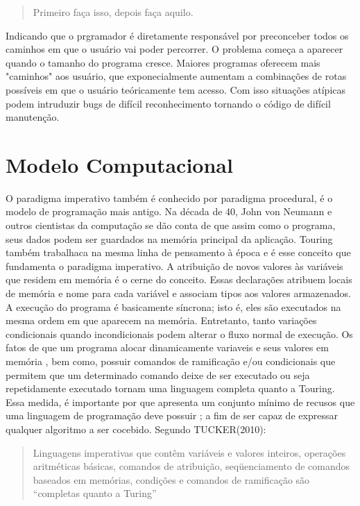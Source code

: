 \documentclass[11pt]{article}
\begin{document}
\begin{quote}
Primeiro faça isso, depois faça aquilo.
\end{quote}

Indicando que o prgramador é diretamente responsável por preconceber todos os caminhos em que o usuário vai poder percorrer. O problema começa a aparecer quando o tamanho do programa cresce. Maiores programas oferecem mais "caminhos" aos usuário, que exponecialmente aumentam a combinações de rotas possíveis em que o usuário teóricamente tem acesso. Com isso situações atípicas podem intruduzir bugs de difícil reconhecimento tornando o código de difícil manutenção.

\section{Modelo Computacional}
\label{sec:org42806ee}

O paradigma imperativo também é conhecido por paradigma procedural, é o modelo de programação mais antigo. Na década de 40, John von Neumann e outros cientistas da computação se dão conta de que assim como o programa, seus dados podem ser guardados na memória principal da aplicação. Touring também trabalhaca na mesma linha de pensamento à época e é esse conceito que fundamenta o paradigma imperativo. A atribuição de novos valores às variáveis que residem em memória é o cerne do conceito.
Essas declarações atribuem locais de memória e nome para cada variável e associam tipos aos valores armazenados. A execução do programa é basicamente síncrona; isto é, eles são executados na mesma ordem em que aparecem na memória. Entretanto, tanto variações condicionais quando incondicionais podem alterar o fluxo normal de execução. Os fatos de que um programa alocar dinamicamente variaveis e seus valores em memória , bem como, possuir comandos de ramificação e/ou condicionais que permitem que um determinado comando deixe de ser executado ou seja repetidamente executado tornam uma linguagem completa quanto a Touring.
Essa medida, é importante por que apresenta um conjunto mínimo de recusos que uma linguagem de programação deve possuir ; a fim de ser capaz de expressar qualquer algoritmo a ser cocebido. Segundo TUCKER(2010):
\begin{quote}
Linguagens imperativas que contêm variáveis e valores inteiros, operações aritméticas básicas, comandos de atribuição, seqüenciamento de comandos baseados em memórias, condições e comandos de ramificação são “completas quanto a Turing”
\end{quote}
\end{document}

